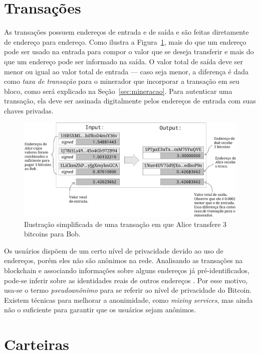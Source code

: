 \section{Transações}

As transações possuem endereços de entrada e de saída e são feitas diretamente de endereço para endereço. Como ilustra a Figura~\ref{fig:transacao}, mais do que um endereço pode ser usado na entrada para compor o valor que se deseja transferir e mais do que um endereço pode ser informado na saída. O valor total de saída deve ser menor ou igual ao valor total de entrada --- caso seja menor, a diferença é dada como \textit{taxa de transação} para o minerador que incorporar a transação em seu bloco, como será explicado na Seção~\ref{sec:mineracao}. Para autenticar uma transação, ela deve ser assinada digitalmente pelos endereços de entrada com suas chaves privadas.

\begin{figure}[h!]
	\centering
	\includegraphics[scale=1]{./images/transacao.pdf}
	\caption{Ilustração simplificada de uma transação em que Alice transfere 3 bitcoins para Bob. \label{fig:transacao}}
\end{figure}

Os usuários dispõem de um certo nível de privacidade devido ao uso de endereços, porém eles não são anônimos na rede. Analisando as transações na blockchain e associando informações sobre alguns endereços já pré-identificados, pode-se inferir sobre as identidades reais de outros endereços \cite{bib:anonimidade}. Por esse motivo, usa-se o termo \textit{pseudoanônimo} para se referir ao nível de privacidade do Bitcoin. Existem técnicas para melhorar a anonimidade, como \textit{mixing services}, mas ainda não o suficiente para garantir que os usuários sejam anônimos.

\section{Carteiras}

